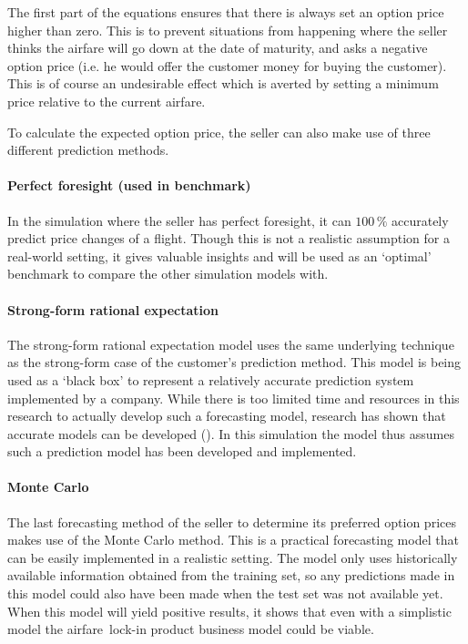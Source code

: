 The first part of the equations ensures that there is always set an option price higher than zero. This is to prevent situations from happening where the seller thinks the airfare will go down at the date of maturity, and asks a negative option price (i.e. he would offer the customer money for buying the customer). This is of course an undesirable effect which is averted by setting a minimum price relative to the current airfare.

To calculate the expected option price, the seller can also make use of three different prediction methods.

\paragraph{Perfect foresight (used in benchmark)}
In the simulation where the seller has perfect foresight, it can $100\,\%$ accurately predict price changes of a flight. Though this is not a realistic assumption for a real-world setting, it gives valuable insights and will be used as an `optimal' benchmark to compare the other simulation models with.

\paragraph{Strong-form rational expectation}
The strong-form rational expectation model uses the same underlying technique as the strong-form case of the customer's prediction method. This model is being used as a `black box' to represent a relatively accurate prediction system implemented by a company. While there is too limited time and resources in this research to actually develop such a forecasting model, research has shown that accurate models can be developed (). In this simulation the model thus assumes such a prediction model has been developed and implemented.

\paragraph{Monte Carlo}
The last forecasting method of the seller to determine its preferred option prices makes use of the Monte Carlo method. This is a practical forecasting model that can be easily implemented in a realistic setting. The model only uses historically available information obtained from the training set, so any predictions made in this model could also have been made when the test set was not available yet. When this model will yield positive results, it shows that even with a simplistic model the airfare~lock-in product business model could be viable.



